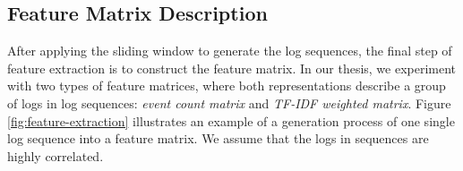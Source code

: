 \begin{figure}[!tbp] 
\end{figure}

\subsection{Feature Matrix Description}
After applying the sliding window to generate the log sequences, the final step of feature extraction is to construct the feature matrix. In our thesis, we experiment with two types of feature matrices, where both representations describe a group of logs in log sequences: \textit{event count matrix} and \textit{TF-IDF weighted matrix}. Figure \ref{fig:feature-extraction} illustrates an example of a generation process of one single log sequence into a feature matrix. We assume that the logs in sequences are highly correlated.

